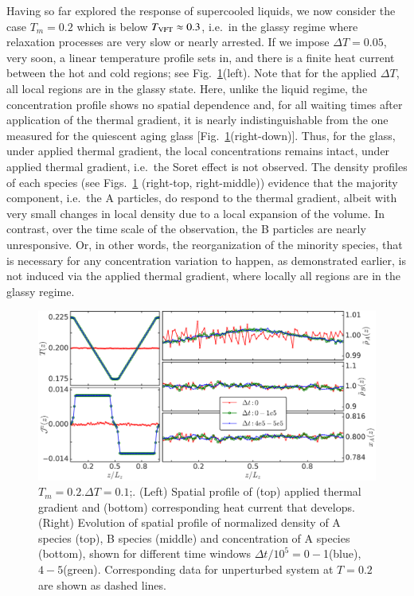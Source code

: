 Having so far explored the response of supercooled liquids, we now consider the case $T_m=0.2$ which is below $T_{\rm VFT}\approx{0.3}$, i.e.~in the glassy regime where relaxation processes are very slow or nearly arrested.  If we impose $\Delta{T}=0.05$, very soon, a linear temperature profile sets in, and there is a finite heat current between the hot and cold regions; see Fig.~\ref{fig3p10}(left). Note that for the applied $\Delta{T}$, all local regions are in the glassy state. Here, unlike the liquid regime, the concentration profile shows no spatial dependence and, for all waiting times after application of the thermal gradient, it is nearly indistinguishable from the one measured for the quiescent aging glass [Fig.~\ref{fig3p10}(right-down)].  Thus, for the glass, under applied thermal gradient, the local concentrations remains intact, under applied thermal gradient, i.e.~the Soret effect is not observed. The density profiles of each species (see Figs.~\ref{fig3p10} (right-top, right-middle)) evidence that the majority component, i.e.~the A particles, do respond to the thermal gradient, albeit with very small changes in local density due to a local expansion of the volume.  In contrast, over the time scale of the observation, the B particles are nearly unresponsive.  Or, in other words, the reorganization of the minority species, that is necessary for any concentration variation to happen, as demonstrated earlier, is not induced via the applied thermal gradient, where locally all regions are in the glassy regime.

%
\begin{figure}[hbt!]
    \centering
	\includegraphics[width=15cm]{figs/fig3p10.pdf}
	\caption[{\em Thermal response at $T_m=0.2$}]{$T_m=0.2$.$\Delta{T}=0.1$;. (Left) Spatial profile of (top) applied thermal gradient and (bottom) corresponding heat current that develops. (Right) Evolution of spatial profile of normalized density of A species (top), B species (middle) and concentration of A species (bottom), {shown for  different time windows $\Delta{t}/10^5=0-$1(blue), $4-5$(green)}. Corresponding data for unperturbed system at $T=0.2$ are shown as dashed lines. \label{fig3p10}}
\end{figure}
%

